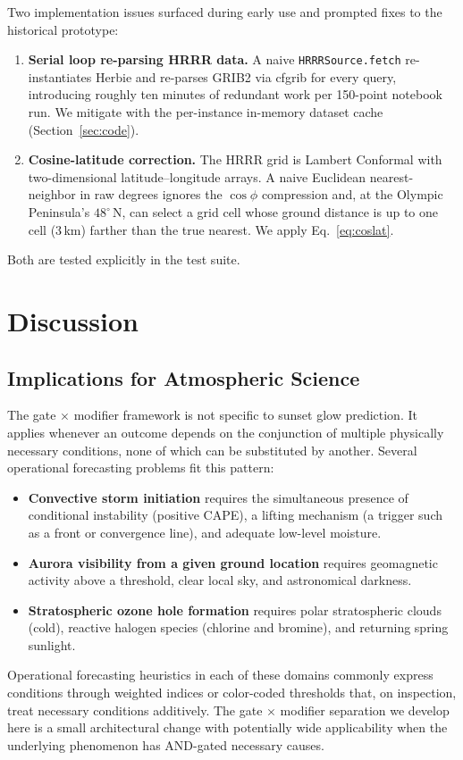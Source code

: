 \documentclass[11pt,a4paper]{article}
\begin{document}
Two implementation issues surfaced during early use and prompted fixes to the historical prototype:
\begin{enumerate}
\item \textbf{Serial loop re-parsing HRRR data.} A naive \texttt{HRRRSource.fetch} re-instantiates Herbie and re-parses GRIB2 via cfgrib for every query, introducing roughly ten minutes of redundant work per 150-point notebook run. We mitigate with the per-instance in-memory dataset cache (Section~\ref{sec:code}).
\item \textbf{Cosine-latitude correction.} The HRRR grid is Lambert Conformal with two-dimensional latitude--longitude arrays. A naive Euclidean nearest-neighbor in raw degrees ignores the $\cos\phi$ compression and, at the Olympic Peninsula's $48^\circ$\,N, can select a grid cell whose ground distance is up to one cell (3\,km) farther than the true nearest. We apply Eq.~\ref{eq:coslat}.
\end{enumerate}
Both are tested explicitly in the test suite.

\section{Discussion}
\label{sec:discussion}

\subsection{Implications for Atmospheric Science}

The gate $\times$ modifier framework is not specific to sunset glow prediction. It applies whenever an outcome depends on the conjunction of multiple physically necessary conditions, none of which can be substituted by another. Several operational forecasting problems fit this pattern:
\begin{itemize}
\item \textbf{Convective storm initiation} requires the simultaneous presence of conditional instability (positive CAPE), a lifting mechanism (a trigger such as a front or convergence line), and adequate low-level moisture.
\item \textbf{Aurora visibility from a given ground location} requires geomagnetic activity above a threshold, clear local sky, and astronomical darkness.
\item \textbf{Stratospheric ozone hole formation} requires polar stratospheric clouds (cold), reactive halogen species (chlorine and bromine), and returning spring sunlight.
\end{itemize}
Operational forecasting heuristics in each of these domains commonly express conditions through weighted indices or color-coded thresholds that, on inspection, treat necessary conditions additively. The gate $\times$ modifier separation we develop here is a small architectural change with potentially wide applicability when the underlying phenomenon has AND-gated necessary causes.
\end{document}
